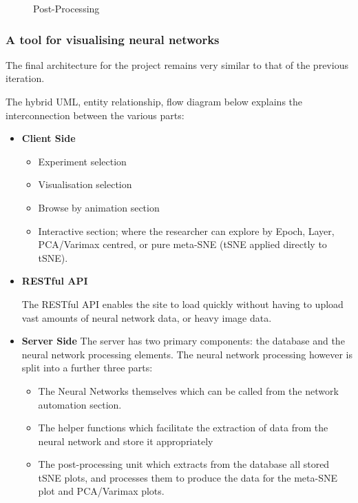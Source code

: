\documentclass[a4paper,11pt,titlepage]{article}
\begin{document}
	\begin{figure}[H]
    			\caption{Post-Processing}%
	\end{figure}	
	
	
	\subsubsection{A tool for visualising neural networks}
	The final architecture for the project remains very similar to that of the previous iteration. 
	\par 
	The	hybrid UML, entity relationship, flow diagram below explains the interconnection between the various parts:
	\begin{itemize}
		\item \textbf{Client Side}
			\begin{itemize}
				\item Experiment selection
				\item Visualisation selection
				\item Browse by animation section
				\item Interactive section; where the researcher can explore by Epoch, Layer, PCA/Varimax centred, or pure meta-SNE (tSNE applied directly to tSNE).
			\end{itemize}
		\item \textbf{RESTful API}	
			\par 
			The RESTful API enables the site to load quickly without having to upload vast amounts of neural network data, or heavy image data.  
		\item \textbf{Server Side}
			The server has two primary components: the database and the neural network processing elements. The neural network processing however is split into a further three parts:
			\begin{itemize}
				\item The Neural Networks themselves which can be called from the network automation section.
				\item The helper functions which facilitate the extraction of data from the neural network and store it appropriately
				\item The post-processing unit which extracts from the database all stored tSNE plots, and processes them to produce the data for the meta-SNE plot and PCA/Varimax plots.
			\end{itemize}
	\end{itemize}
	
\end{document}
